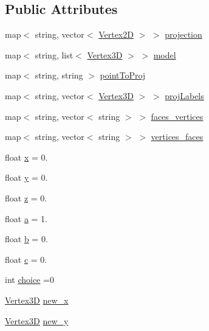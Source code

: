 \subsection*{Public Attributes}
\begin{DoxyCompactItemize}
\item 
map$<$ string, vector$<$ \hyperlink{struct_vertex2_d}{Vertex2D} $>$ $>$ \hyperlink{class_three___to___two_a39ed690740565f107b2b65a678e0ab5e}{projection}
\item 
map$<$ string, list$<$ \hyperlink{struct_vertex3_d}{Vertex3D} $>$ $>$ \hyperlink{class_three___to___two_ab89e25f994881aea2bdae437e397f970}{model}
\item 
map$<$ string, string $>$ \hyperlink{class_three___to___two_a10db4a5f7a04743b00ce1f9215147dcc}{point\+To\+Proj}
\item 
map$<$ string, vector$<$ \hyperlink{struct_vertex3_d}{Vertex3D} $>$ $>$ \hyperlink{class_three___to___two_abb86c66855183ae0463c28af722997bb}{proj\+Labels}
\item 
map$<$ string, vector$<$ string $>$ $>$ \hyperlink{class_three___to___two_a2f86f24e2cbd6f19b7288c3b0f401f49}{faces\+\_\+vertices}
\item 
map$<$ string, vector$<$ string $>$ $>$ \hyperlink{class_three___to___two_ab76600933c530c9a6e7a54cf39df7bc9}{vertices\+\_\+faces}
\item 
float \hyperlink{class_three___to___two_a62f60abbec70c062d40369bae26d8bfc}{x} = 0.
\item 
float \hyperlink{class_three___to___two_a74c72941752a52a87c13e4268ec37cc8}{y} = 0.
\item 
float \hyperlink{class_three___to___two_a2dc98edd9d60378c346b61e988f966f9}{z} = 0.
\item 
float \hyperlink{class_three___to___two_a8396aaabde6a54cdc6a36b6d263d94e5}{a} = 1.
\item 
float \hyperlink{class_three___to___two_a4859d8dc45f60e772c55ab2923bab71c}{b} = 0.
\item 
float \hyperlink{class_three___to___two_aaf40e46b50333549d03205a22974fce0}{c} = 0.
\item 
int \hyperlink{class_three___to___two_abfb1f1c097808c8faf3f6cb28911491d}{choice} =0
\item 
\hyperlink{struct_vertex3_d}{Vertex3D} \hyperlink{class_three___to___two_a5e20357c42384b2e7aecfdf88ccbd898}{new\+\_\+x}
\item 
\hyperlink{struct_vertex3_d}{Vertex3D} \hyperlink{class_three___to___two_a6d516a8a5fa8b8ee2dd1c64195725ab7}{new\+\_\+y}

\end{DoxyCompactItemize}

